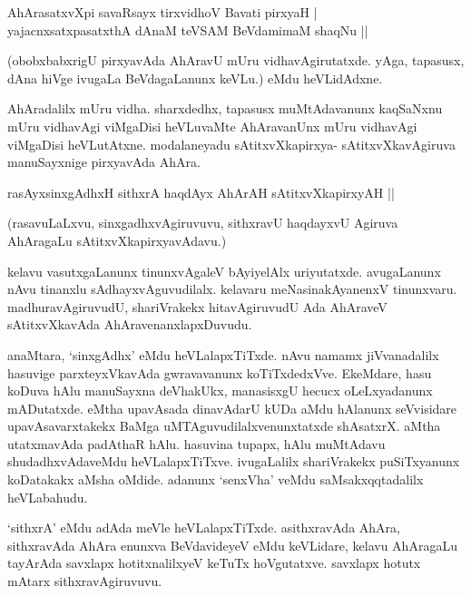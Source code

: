 \begin{shloka}
AhArasatxvXpi savaRsayx tirxvidhoV Bavati pirxyaH |\\
yajacnxsatxpasatxthA dAnaM teVSAM BeVdamimaM shaqNu ||
\end{shloka}

(obobxbabxrigU pirxyavAda AhAravU mUru vidhavAgirutatxde. yAga, tapasusx, dAna hiVge ivugaLa BeVdagaLanunx keVLu.) eMdu heVLidAdxne.


AhAradalilx mUru vidha. sharxdedhx, tapasusx muMtAdavanunx kaqSaNxnu mUru vidhavAgi viMgaDisi heVLuvaMte AhAravanUnx mUru vidhavAgi viMgaDisi heVLutAtxne. modalaneyadu sAtitxvXkapirxya- sAtitxvXkavAgiruva manuSayxnige pirxyavAda AhAra.

\begin{shloka}
rasAyxsinxgAdhxH sithxrA haqdAyx AhArAH sAtitxvXkapirxyAH ||
\end{shloka}

(rasavuLaLxvu, sinxgadhxvAgiruvuvu, sithxravU haqdayxvU Agiruva AhAragaLu sAtitxvXkapirxyavAdavu.)

kelavu vasutxgaLanunx tinunxvAgaleV bAyiyelAlx uriyutatxde. avugaLanunx nAvu tinanxlu sAdhayxvAguvudilalx. kelavaru meNasinakAyanenxV tinunxvaru. madhuravAgiruvudU, shariVrakekx hitavAgiruvudU Ada AhAraveV sAtitxvXkavAda AhAravenanxlapxDuvudu.

anaMtara, `sinxgAdhx' eMdu heVLalapxTiTxde. nAvu namamx jiVvanadalilx hasuvige parxteyxVkavAda gwravavanunx koTiTxdedxVve. EkeMdare, hasu koDuva hAlu manuSayxna deVhakUkx, manasisxgU hecucx oLeLxyadanunx mADutatxde. eMtha upavAsada dinavAdarU kUDa aMdu hAlanunx seVvisidare upavAsavarxtakekx BaMga uMTAguvudilalxvenunxtatxde shAsatxrX. aMtha utatxmavAda padAthaR hAlu. hasuvina tupapx, hAlu muMtAdavu shudadhxvAdaveMdu heVLalapxTiTxve. ivugaLalilx shariVrakekx puSiTxyanunx koDatakakx aMsha oMdide. adanunx `senxVha' veMdu saMsakxqqtadalilx heVLabahudu.

`sithxrA' eMdu adAda meVle heVLalapxTiTxde. asithxravAda AhAra, sithxravAda AhAra enunxva BeVdavideyeV eMdu keVLidare, kelavu AhAragaLu tayArAda savxlapx hotitxnalilxyeV keTuTx hoVgutatxve. savxlapx hotutx mAtarx sithxravAgiruvuvu.

